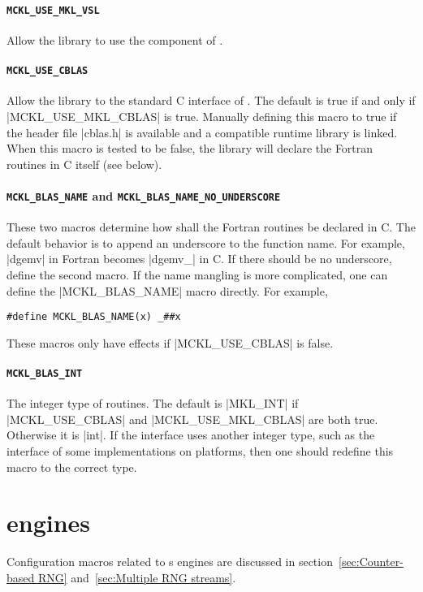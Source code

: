 \paragraph{\texttt{MCKL\_USE\_MKL\_VSL}} Allow the library to use the \vsl
component of \mkl.

\paragraph{\texttt{MCKL\_USE\_CBLAS}} Allow the library to the standard C
interface of \blas. The default is true if and only if |MCKL_USE_MKL_CBLAS| is
true. Manually defining this macro to true if the header file |cblas.h| is
available and a compatible runtime library is linked. When this macro is tested
to be false, the library will declare the \blas Fortran routines in C itself
(see below).

\paragraph{\texttt{MCKL\_BLAS\_NAME} and
\texttt{MCKL\_BLAS\_NAME\_NO\_UNDERSCORE}} These two macros determine how shall
the \blas Fortran routines be declared in C. The default behavior is to append
an underscore to the function name. For example, |dgemv| in Fortran becomes
|dgemv_| in C. If there should be no underscore, define the second macro. If
the name mangling is more complicated, one can define the |MCKL_BLAS_NAME|
macro directly. For example,
\begin{verbatim}
#define MCKL_BLAS_NAME(x) _##x
\end{verbatim}
These macros only have effects if |MCKL_USE_CBLAS| is false.

\paragraph{\texttt{MCKL\_BLAS\_INT}} The integer type of \blas routines. The
default is |MKL_INT| if |MCKL_USE_CBLAS| and |MCKL_USE_MKL_CBLAS| are both
true. Otherwise it is |int|. If the \blas interface uses another integer type,
such as the \ilp interface of some implementations on \lp platforms, then one
should redefine this macro to the correct type.

\section{\texorpdfstring{\rng}{RNG} engines}
\label{sec:RNG engines}

Configuration macros related to \rng{}s engines are discussed in
section~\ref{sec:Counter-based RNG} and~\ref{sec:Multiple RNG streams}.

